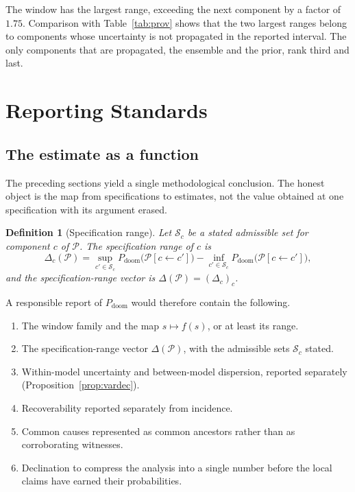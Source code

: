 \documentclass[11pt]{article}
\newtheorem{definition}{Definition}[section]
\theoremstyle{remark}
\newcommand{\PD}{P_{\mathrm{doom}}}
\begin{document}
The window has the largest range, exceeding the next component by a factor of $1.75$. Comparison with Table~\ref{tab:prov} shows that the two largest ranges belong to components whose uncertainty is not propagated in the reported interval. The only components that are propagated, the ensemble and the prior, rank third and last.

\section{Reporting Standards}\label{sec:report}

\subsection{The estimate as a function}

The preceding sections yield a single methodological conclusion. The honest object is the map from specifications to estimates, not the value obtained at one specification with its argument erased.

\begin{definition}[Specification range]\label{def:specrange}
Let $\mathcal{S}_c$ be a stated admissible set for component $c$ of $\mathcal{P}$. The \emph{specification range} of $c$ is
\begin{equation}
\Delta_c(\mathcal{P})=\sup_{c'\in\mathcal{S}_c}\PD\bigl(\mathcal{P}[c\leftarrow c']\bigr)-\inf_{c'\in\mathcal{S}_c}\PD\bigl(\mathcal{P}[c\leftarrow c']\bigr),
\end{equation}
and the \emph{specification-range vector} is $\Delta(\mathcal{P})=(\Delta_c)_c$.
\end{definition}

A responsible report of $\PD$ would therefore contain the following.
\begin{enumerate}[label=(R\arabic*),leftmargin=3em]
  \item The window family and the map $s\mapsto f(s)$, or at least its range.
  \item The specification-range vector $\Delta(\mathcal{P})$, with the admissible sets $\mathcal{S}_c$ stated.
  \item Within-model uncertainty and between-model dispersion, reported separately (Proposition~\ref{prop:vardec}).
  \item Recoverability reported separately from incidence.
  \item Common causes represented as common ancestors rather than as corroborating witnesses.
  \item Declination to compress the analysis into a single number before the local claims have earned their probabilities.
\end{enumerate}
\end{document}
